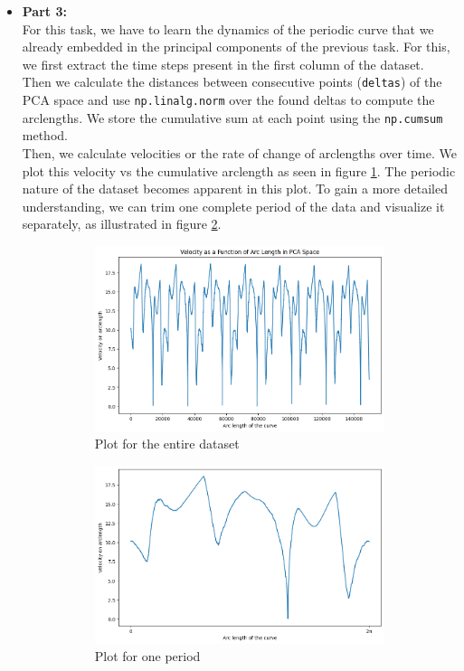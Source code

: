 \begin{itemize}
 
\item \textbf{Part 3:} \\
For this task, we have to learn the dynamics of the periodic curve that we already embedded in the principal components of the previous task. For this, we first extract the time steps present in the first column of the dataset. Then we calculate the distances between consecutive points (\texttt{deltas}) of the PCA space and use \texttt{np.linalg.norm} over the found deltas to compute the arclengths. We store the cumulative sum at each point using the \texttt{np.cumsum} method.\\
Then, we calculate velocities or the rate of change of arclengths over time. We plot this velocity vs the cumulative arclength as seen in figure \ref{fig:task5_3_1}. The periodic nature of the dataset becomes apparent in this plot. To gain a more detailed understanding, we can trim one complete period of the data and visualize it separately, as illustrated in figure \ref{task5_3_2}.
\begin{figure}[H]
\centering
    \begin{subfigure}{0.45\textwidth}
        \includegraphics[width=\linewidth]{images/Ex5task5_31.png}
        \caption{Plot for the entire dataset}
        \label{fig:task5_3_1}
    \end{subfigure}
    \begin{subfigure}{0.45\textwidth}
        \includegraphics[width=\linewidth]
        {images/Ex5task5_32.png}
        \caption{Plot for one period}
        \label{task5_3_2}
    \end{subfigure}
    \label{task5_3}
    \caption{}
\end{figure}


\end{itemize}

